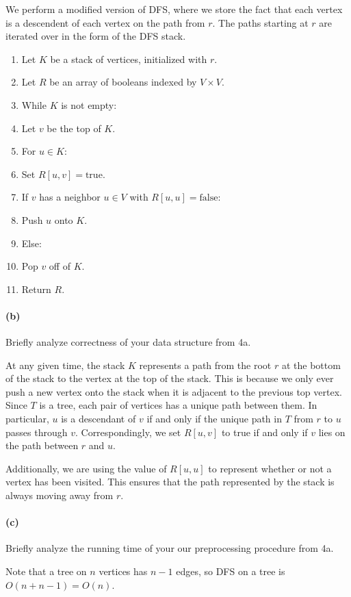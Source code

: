 \documentclass[12pt]{article}
\newlength{\myparskip}
\newenvironment{fullbox}{\begin{lrbox}{\savefullbox}\begin{minipage}{\dimexpr\textwidth-2\fboxsep\relax}\setlength{\parskip}{\myparskip}}{\end{minipage}\end{lrbox}\framebox[\textwidth]{\usebox{\savefullbox}}}
\newenvironment{pbox}[1][]{\begin{fullbox}\def\temp{#1}\ifx\temp\empty\else\paragraph{#1}\phantom{}\fi}{\end{fullbox}}
\theoremstyle{definition}
\newcommand{\<}{\langle}
\renewcommand{\>}{\rangle}
\newcommand{\tab}{\hspace{1cm}}
\begin{document}
We perform a modified version of DFS, where we store the fact that each vertex is a descendent of each vertex on the path from $r$.
The paths starting at $r$ are iterated over in the form of the DFS stack.

\begin{enumerate}
    \item Let $K$ be a stack of vertices, initialized with $r$.
    \item Let $R$ be an array of booleans indexed by $V \times V$.
    \item While $K$ is not empty:
    \item \tab Let $v$ be the top of $K$.
    \item \tab For $u \in K$:
    \item \tab\tab Set $R[u, v] = \mathrm{true}$.
    \item \tab If $v$ has a neighbor $u \in V$ with $R[u, u] = \mathrm{false}$:
    \item \tab\tab Push $u$ onto $K$.
    \item \tab Else:
    \item \tab\tab Pop $v$ off of $K$.
    \item Return $R$.
\end{enumerate}

\begin{pbox}[(b)]
    Briefly analyze correctness of your data structure from 4a.
\end{pbox}

At any given time, the stack $K$ represents a path from the root $r$ at the bottom of the stack to the vertex at the top of the stack.
This is because we only ever push a new vertex onto the stack when it is adjacent to the previous top vertex.
Since $T$ is a tree, each pair of vertices has a unique path between them.
In particular, $u$ is a descendant of $v$ if and only if the unique path in $T$ from $r$ to $u$ passes through $v$.
Correspondingly, we set $R[u, v]$ to true if and only if $v$ lies on the path between $r$ and $u$.

Additionally, we are using the value of $R[u, u]$ to represent whether or not a vertex has been visited.
This ensures that the path represented by the stack is always moving away from $r$.

\newpage
\begin{pbox}[(c)]
    Briefly analyze the running time of your our preprocessing procedure from 4a.
\end{pbox}

Note that a tree on $n$ vertices has $n - 1$ edges, so DFS on a tree is $O(n + n - 1) = O(n)$.
\end{document}
